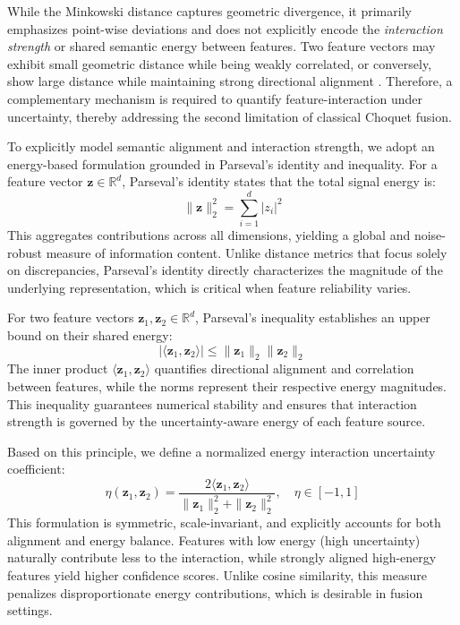 \documentclass[preprint,12pt]{elsarticle}
\begin{document}
While the Minkowski distance captures geometric divergence, it primarily emphasizes point-wise deviations and does not explicitly encode the \emph{interaction strength} or shared semantic energy between features. Two feature vectors may exhibit small geometric distance while being weakly correlated, or conversely, show large distance while maintaining strong directional alignment . Therefore, a complementary mechanism is required to quantify feature-interaction under uncertainty, thereby addressing the second limitation of classical Choquet fusion.

To explicitly model semantic alignment and interaction strength, we adopt an energy-based formulation grounded in Parseval's identity and inequality. For a feature vector $\mathbf{z} \in \mathbb{R}^d$, Parseval's identity states that the total signal energy is:
\begin{equation*}
    \|\mathbf{z}\|_2^2 = \sum_{i=1}^{d} |z_i|^2
    \label{eq:parseval_identity}
\end{equation*}
This aggregates contributions across all dimensions, yielding a global and noise-robust measure of information content. Unlike distance metrics that focus solely on discrepancies, Parseval's identity directly characterizes the magnitude of the underlying representation, which is critical when feature reliability varies.

For two feature vectors $\mathbf{z}_1, \mathbf{z}_2 \in \mathbb{R}^d$, Parseval's inequality establishes an upper bound on their shared energy:
\begin{equation*}
    |\langle \mathbf{z}_1, \mathbf{z}_2 \rangle| \leq \|\mathbf{z}_1\|_2 \|\mathbf{z}_2\|_2
    \label{eq:parseval_inequality}
\end{equation*}
The inner product $\langle \mathbf{z}_1, \mathbf{z}_2 \rangle$ quantifies directional alignment and correlation between features, while the norms represent their respective energy magnitudes. This inequality guarantees numerical stability and ensures that interaction strength is governed by the uncertainty-aware energy of each feature source.

Based on this principle, we define a normalized energy interaction uncertainty coefficient:
\begin{equation*}
    \eta(\mathbf{z}_1, \mathbf{z}_2) = \frac{2\langle \mathbf{z}_1, \mathbf{z}_2 \rangle}{\|\mathbf{z}_1\|_2^2 + \|\mathbf{z}_2\|_2^2}, \quad \eta \in [-1, 1]
    \label{eq:eta}
\end{equation*}
This formulation is symmetric, scale-invariant, and explicitly accounts for both alignment and energy balance. Features with low energy (high uncertainty) naturally contribute less to the interaction, while strongly aligned high-energy features yield higher confidence scores. Unlike cosine similarity, this measure penalizes disproportionate energy contributions, which is desirable in fusion settings.
\end{document}

